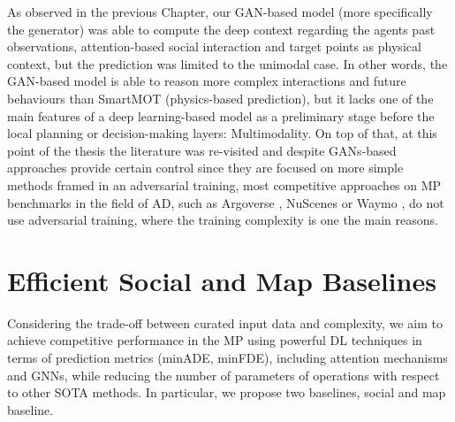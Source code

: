 As observed in the previous Chapter, our \ac{GAN}-based model (more specifically the generator) was able to compute the deep context regarding the agents past observations, attention-based social interaction and target points as physical context, but the prediction was limited to the unimodal case. In other words, the \ac{GAN}-based model is able to reason more complex interactions and future behaviours than SmartMOT (physics-based prediction), but it lacks one of the main features of a deep learning-based model as a preliminary stage before the local planning or decision-making layers: Multimodality. On top of that, at this point of the thesis the literature was re-visited and despite \acp{GAN}-based approaches \cite{sadeghian2019sophie, dendorfer2020goal, gupta2018social, gomez2022exploring} provide certain control since they are focused on more simple methods framed in an adversarial training, most competitive approaches on \ac{MP} benchmarks in the field of \ac{AD}, such as Argoverse \cite{chang2019argoverse}, NuScenes \cite{caesar2020nuscenes} or Waymo \cite{ettinger2021large}, do not use adversarial training, where the training complexity is one the main reasons.

\section{Efficient Social and Map Baselines}
\label{sec:6_efficient_baselines}

Considering the trade-off between curated input data and complexity, we aim to achieve competitive performance in the \ac{MP} using powerful DL techniques in terms of prediction metrics (\ac{minADE}, \ac{minFDE}), including attention mechanisms and \acp{GNN}, while reducing the number of parameters of operations with respect to other \ac{SOTA} methods. In particular, we propose two baselines, social and map baseline. 

